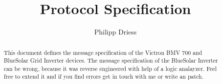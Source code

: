 \documentclass[a4paper,10pt]{article}
\title{Protocol Specification}
\author{Philipp Driess}
\begin{document}
\maketitle

\begin{abstract}
This document defines the message specification of the Victron BMV 700 and 
BlueSolar Grid Inverter devices. The message specification of the BlueSolar 
Inverter can be wrong, because it was reverse engineered with help of a logic 
analayzer.
Feel free to extend it and if you find errors get in touch with me or write an 
patch. 
\end{abstract}
\newpage
\tableofcontents




\end{document}
